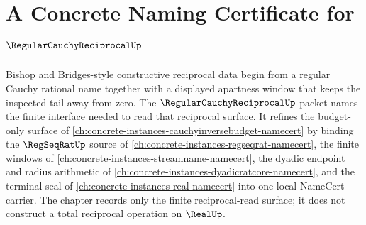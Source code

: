 \chapter{A Concrete Naming Certificate for $\RegularCauchyReciprocalUp$}
\label{ch:concrete-instances-regular-cauchy-reciprocal-namecert}

Bishop and Bridges-style constructive reciprocal data begin from a regular Cauchy rational name together with a displayed apartness window that keeps the inspected tail away from zero. The $\RegularCauchyReciprocalUp$ packet names the finite interface needed to read that reciprocal surface. It refines the budget-only surface of \autoref{ch:concrete-instances-cauchyinversebudget-namecert} by binding the $\RegSeqRatUp$ source of \autoref{ch:concrete-instances-regseqrat-namecert}, the finite windows of \autoref{ch:concrete-instances-streamname-namecert}, the dyadic endpoint and radius arithmetic of \autoref{ch:concrete-instances-dyadicratcore-namecert}, and the terminal seal of \autoref{ch:concrete-instances-real-namecert} into one local NameCert carrier. The chapter records only the finite reciprocal-read surface; it does not construct a total reciprocal operation on $\RealUp$.


